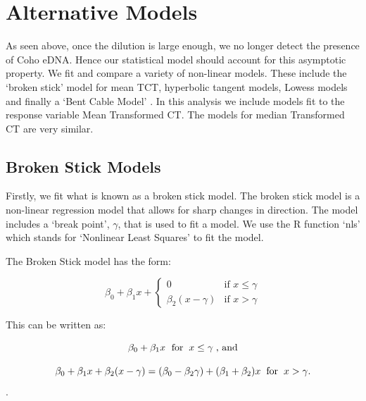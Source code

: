 \section{Alternative Models}



As seen above, once the dilution is large enough, we no longer detect the presence of Coho eDNA. Hence our statistical model should account for this asymptotic property. We fit and compare a variety of  non-linear models. These include the `broken stick' model for mean TCT, hyperbolic tangent models, Lowess models and finally a `Bent Cable Model' \citep{piecewiseregression}. In this analysis we include models fit to the response variable Mean Transformed CT. The models for median Transformed CT are very similar.

\subsection{Broken Stick Models}

Firstly, we fit what is known as a broken stick model. The broken stick model is a non-linear regression model that allows for sharp changes in direction.
The model includes a `break point', $\gamma$, that is used to fit a model. We use the R function `nls' \citep{nlsTools} which stands for `Nonlinear Least Squares' to fit the model. 

\vspace{3mm}

The Broken Stick model has the form:

\vspace{3mm}

 $$ \beta_{0}+\beta_{1}x+ \begin{cases}
0  &  \text{if    } x \le \gamma \\[2ex]
\beta_{2}(x-\gamma)  & \text{if    } x > \gamma
\end{cases}$$


This can be written as:

$$\beta_{0}+\beta_{1}x \hspace{1mm} \mbox{ for} \hspace{2mm} x \le \gamma \hspace{1mm} \mbox{, and}$$


$$\beta_{0}+\beta_{1}x+\beta_{2}(x-\gamma)=(\beta_{0}-\beta_{2}\gamma)+(\beta_{1}+\beta_{2})x \hspace{2mm} \mbox{for} \hspace{2mm}  x > \gamma \mbox{.} $$.


